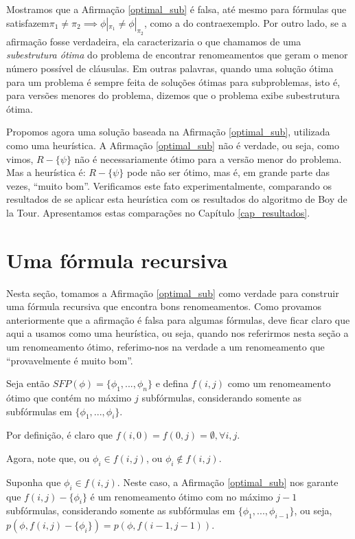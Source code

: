 Mostramos que a Afirmação \ref{optimal_sub} é falsa, até mesmo para fórmulas que satisfazem\break $\pi_1 \neq \pi_2 \implies \phi|_{\pi_1} \neq \phi|_{\pi_2}$, como a do contraexemplo. Por outro lado, se a afirmação fosse verdadeira, ela caracterizaria o que chamamos de uma \emph{subestrutura ótima} do problema de encontrar renomeamentos que geram o menor número possível de cláusulas. Em outras palavras, quando uma solução ótima para um problema é sempre feita de soluções ótimas para subproblemas, isto é, para versões menores do problema, dizemos que o problema exibe subestrutura ótima.

Propomos agora uma solução baseada na Afirmação \ref{optimal_sub}, utilizada como uma heurística. A Afirmação \ref{optimal_sub} não é verdade, ou seja, como vimos, $R - \{\psi \}$ não é necessariamente ótimo para a versão menor do problema. Mas a heurística é: $R - \{\psi \}$ pode não ser ótimo, mas é, em grande parte das vezes, ``muito bom''. Verificamos este fato experimentalmente, comparando os resultados de se aplicar esta heurística com os resultados do algoritmo de Boy de la Tour. Apresentamos estas comparações no Capítulo \ref{cap_resultados}.

\section{Uma fórmula recursiva}
\label{formula_recursiva}

\indent

Nesta seção, tomamos a Afirmação \ref{optimal_sub} como verdade para construir uma fórmula recursiva que encontra bons renomeamentos. Como provamos anteriormente que a afirmação é falsa para algumas fórmulas, deve ficar claro que aqui a usamos como uma heurística, ou seja, quando nos referirmos nesta seção a um renomeamento ótimo, referimo-nos na verdade a um renomeamento que ``provavelmente é muito bom''.

Seja então $SFP(\phi) = \{\phi_1,...,\phi_n \}$ e defina $f(i,j)$ como um renomeamento ótimo que contém no máximo $j$ subfórmulas, considerando somente as subfórmulas em $\{\phi_1,...,\phi_i \}$.

Por definição, é claro que $f(i,0) = f(0,j) = \emptyset, \forall i,j$.

Agora, note que, ou $\phi_i \in f(i,j)$, ou $\phi_i \notin f(i,j)$.

Suponha que $\phi_i \in f(i,j)$. Neste caso, a Afirmação \ref{optimal_sub} nos garante que $f(i,j) - \{\phi_i \}$ é um renomeamento ótimo com no máximo $j-1$ subfórmulas, considerando somente as subfórmulas em $\{\phi_1,...,\phi_{i-1} \}$, ou seja, $p(\phi,f(i,j) - \{\phi_i \}) = p(\phi,f(i-1,j-1))$.

